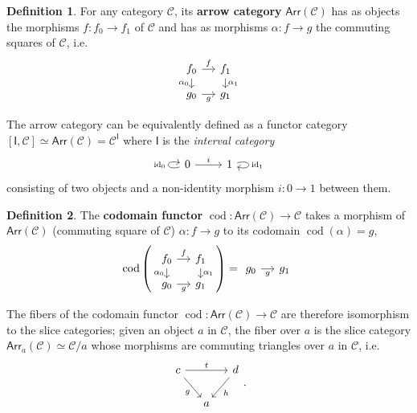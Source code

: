 \documentclass[12pt]{article}
\theoremstyle{definition}
\newtheorem{defn}{Definition}[section]
\theoremstyle{remark}
\DeclareMathOperator{\id}{id}
\DeclareMathOperator{\cod}{cod}
\newcommand{\arr}{\mathsf{Arr}} %
\newcommand{\catC}{\mathcal{C}}
\begin{document}
\begin{defn}
    \label{def:arrow_category}
    For any category $\catC$, its \textbf{arrow category} $\arr(\catC)$ has as objects the morphisms $f : f_0 \to f_1$ of $\catC$ and has as morphisms $\alpha : f \to g$ the commuting squares of $\catC$, i.e.
    \begin{equation}
        \begin{tikzcd}[row sep=small, column sep=small]
            f_0 \ar[r, "f"] \ar[d, "\alpha_0"'] & f_1 \ar[d, "\alpha_1"] \\
            g_0 \ar[r, "g"'] & g_1
        \end{tikzcd}
    \end{equation}
\end{defn}
The arrow category can be equivalently defined as a functor category $[\mathsf{I}, \catC] \simeq \arr(\catC) = \catC^{\mathsf{I}}$ where $\mathsf{I}$ is the \textit{interval category}
\begin{equation}
    \begin{tikzcd}
        0 \ar[loop left, "\id_{0}"] \ar[r, "i"] & 1 \ar[loop right, "\id_{1}"]
    \end{tikzcd}
\end{equation}
consisting of two objects and a non-identity morphism $i : 0 \to 1$ between them.

\begin{defn}
    The \textbf{codomain functor} $\cod : \arr(\catC) \to \catC$ takes a morphism of $\arr(\catC)$ (commuting square of $\catC$) $\alpha : f \to g$ to its codomain $\cod (\alpha) = g$,
    \begin{equation}
        \cod \left(
            \begin{tikzcd}[row sep=small, column sep=small]
                f_0 \ar[r, "f"] \ar[d, "\alpha_0"'] & f_1 \ar[d, "\alpha_1"] \\
                g_0 \ar[r, "g"'] & g_1
            \end{tikzcd}
        \right)
        =
        \begin{tikzcd}[column sep=small]
            g_0 \ar[r, "g"'] & g_1
        \end{tikzcd}
    \end{equation}
\end{defn}

The fibers of the codomain functor $\cod : \arr(\catC) \to \catC$ are therefore isomorphism to the slice categories; given an object $a$ in $\catC$, the fiber over $a$ is the slice category $\arr_{a}(\catC) \simeq \catC / a$ whose morphisms are commuting triangles over $a$ in $\catC$, i.e.
\begin{equation}
    \begin{tikzcd}[column sep=small]
        c \ar[dr, "g"'] \ar[rr, "t"] & & d \ar[dl, "h"] \\
        & a &
    \end{tikzcd}.
\end{equation}
\end{document}
